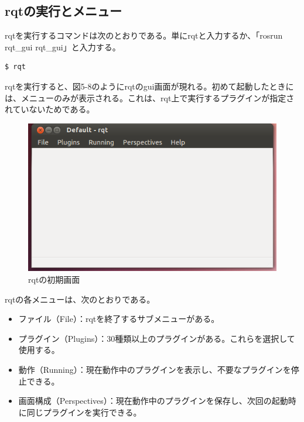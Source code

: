 \subsection{rqtの実行とメニュー}

rqtを実行するコマンドは次のとおりである。単にrqtと入力するか、「rosrun rqt\_gui rqt\_gui」と入力する。

\begin{lstlisting}[language=ROS]
$ rqt
\end{lstlisting}

rqtを実行すると、図5-8のようにrqtのgui画面が現れる。初めて起動したときには、メニューのみが表示される。これは、rqt上で実行するプラグインが指定されていないためである。

\begin{figure}[htp]
  \centering
  \includegraphics[width=\columnwidth]{pictures/chapter5/pic_05_08.png}
  \caption{rqtの初期画面}
\end{figure}

rqtの各メニューは、次のとおりである。

\begin{itemize}
\item ファイル（File）：rqtを終了するサブメニューがある。
\item プラグイン（Plugins）：30種類以上のプラグインがある。これらを選択して使用する。
\item 動作（Running）：現在動作中のプラグインを表示し、不要なプラグインを停止できる。
\item 画面構成（Perspectives）：現在動作中のプラグインを保存し、次回の起動時に同じプラグインを実行できる。
\end{itemize}

